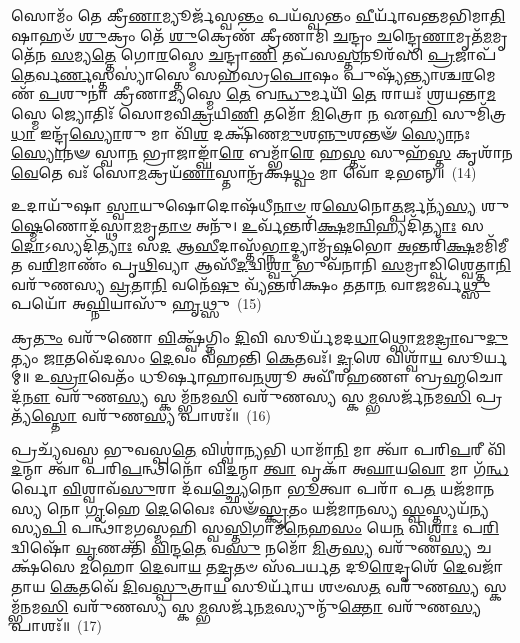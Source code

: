 {\anuvakamend[{𑌅𑌨𑍁᳴ \ul{𑌸}\-𑌪𑍍𑌤 𑌚᳴}]}%

𑌸𑍋𑌮𑌂᳴ 𑌤𑍇 𑌕𑍍𑌰𑍀\-\ul{𑌣𑌾}\-𑌮𑍍𑌯𑍂𑌰𑍍𑌜᳴𑌸𑍍𑌵\-\ul{𑌨𑍍𑌤𑌂} 𑌪𑌯᳴𑌸𑍍𑌵𑌨𑍍𑌤𑌂 \ul{𑌵𑍀}\-𑌰𑍍𑌯𑌾᳴𑌵𑌨𑍍𑌤𑌮𑌭𑌿𑌮𑌾\-\ul{𑌤𑌿}\-\-𑌷𑌾𑌹𑍞᳴ \ul{𑌶𑍁}\-𑌕𑍍𑌰𑌂 𑌤𑍇᳴ \ul{𑌶𑍁}\-𑌕𑍍𑌰𑍇𑌣᳴ 𑌕𑍍𑌰𑍀𑌣𑌾𑌮𑌿 \ul{𑌚}\-𑌨𑍍𑌦𑍍𑌰𑌂 \ul{𑌚}\-𑌨𑍍𑌦𑍍𑌰𑍇\-\ul{𑌣𑌾}\-𑌮𑍃𑌤᳴\-\ul{𑌮}\-𑌮𑍃𑌤𑍇᳴𑌨 \ul{𑌸}\-𑌮𑍍𑌯\-\ul{𑌤𑍍𑌤𑍇} 𑌗𑍋\-\ul{𑌰}\-𑌸𑍍𑌮𑍇 \ul{𑌚}\-𑌨𑍍𑌦𑍍𑌰𑌾\-\ul{𑌣𑌿} 𑌤𑌪᳴𑌸\-\ul{𑌸𑍍𑌤}\-𑌨𑍂𑌰᳴𑌸𑌿 \ul{𑌪𑍍𑌰}\-𑌜𑌾𑌪᳴\-\ul{𑌤𑍇}\-𑌰𑍍𑌵\-\ul{𑌰𑍍𑌣}\-𑌸𑍍𑌤𑌸𑍍𑌯𑌾॑𑌸𑍍𑌤𑍇 𑌸𑌹𑌸𑍍𑌰\-\ul{𑌪𑍋}\-𑌷𑌂 𑌪𑍁𑌷𑍍𑌯᳴𑌨𑍍𑌤𑍍𑌯𑌾𑌶𑍍𑌚\-\ul{𑌰}\-𑌮𑍇𑌣᳴ \ul{𑌪}\-𑌶𑍁𑌨𑌾॑ 𑌕𑍍𑌰𑍀𑌣𑌾\-\ul{𑌮𑍍𑌯}\-𑌸𑍍𑌮𑍇 \ul{𑌤𑍇} 𑌬\-\ul{𑌨𑍍𑌧𑍁}\-𑌰𑍍𑌮𑌯𑌿᳴ \ul{𑌤𑍇} 𑌰𑌾𑌯𑌃᳴ 𑌶𑍍𑌰𑌯𑌨𑍍𑌤𑌾\-\ul{𑌮}\-𑌸𑍍𑌮𑍇 𑌜𑍍𑌯𑍋𑌤𑌿𑌃᳴ 𑌸𑍋𑌮𑌵𑌿\-\ul{𑌕𑍍𑌰}\-𑌯𑌿\-\ul{𑌣𑌿} 𑌤𑌮𑍋᳴ \ul{𑌮𑌿}\-𑌤𑍍𑌰𑍋 \ul{𑌨} 𑌏\-\ul{𑌹𑌿} 𑌸𑍁𑌮𑌿᳴𑌤𑍍𑌰\-\ul{𑌧𑌾} 𑌇𑌨𑍍𑌦𑍍𑌰᳴\-\ul{𑌸𑍍𑌯𑍋}\-𑌰𑍁 𑌮𑌾 𑌵𑌿᳴\-\ul{𑌶} 𑌦𑌕𑍍𑌷𑌿᳴𑌣\-\ul{𑌮𑍁}\-𑌶\-\ul{𑌨𑍍𑌨𑍁}\-𑌶𑌨𑍍𑌤𑍟᳴ \ul{𑌸𑍍𑌯𑍋}\-𑌨𑌃 \ul{𑌸𑍍𑌯𑍋}\-𑌨𑍟 𑌸𑍍𑌵𑌾\-\ul{𑌨} 𑌭𑍍𑌰𑌾𑌜𑌾𑌙𑍍𑌘𑌾᳴\-\ul{𑌰𑍇} 𑌬𑌮𑍍𑌭𑌾᳴\-\ul{𑌰𑍇} 𑌹\-\ul{𑌸𑍍𑌤} 𑌸𑍁𑌹᳴\-\ul{𑌸𑍍𑌤} 𑌕𑍃𑌶𑌾᳴𑌨\-\ul{𑌵𑍇}\-𑌤𑍇 𑌵𑌃᳴ 𑌸𑍋\-\ul{𑌮}\-𑌕𑍍𑌰𑌯᳴\-\ul{𑌣𑌾}\-𑌸𑍍𑌤𑌾𑌨𑍍𑌰᳴𑌕𑍍𑌷\-\ul{𑌧𑍍𑌵𑌂} 𑌮𑌾 𑌵𑍋᳴ 𑌦𑌭𑌨𑍍𑌨𑍍॥~(14)

{\anuvakamend[{\-\ul{𑌊}\-𑌰𑍁𑌂 𑌦𑍍𑌵𑌾𑌵𑌿𑍞᳴𑌶𑌤𑌿𑌶𑍍𑌵}]}%

𑌉𑌦𑌾𑌯𑍁᳴𑌷𑌾 \ul{𑌸𑍍𑌵𑌾}\-𑌯𑍁𑌷𑍋𑌦𑍋𑌷᳴𑌧𑍀\-\ul{𑌨𑌾}\-\-\ul{𑍞} 𑌰\-\ul{𑌸𑍇}\-𑌨𑍋\-\ul{𑌤𑍍𑌪}\-𑌰𑍍𑌜𑌨𑍍𑌯᳴\-\ul{𑌸𑍍𑌯} 𑌶𑍁\-\ul{𑌷𑍍𑌮𑍇}\-𑌣𑍋𑌦᳴𑌸𑍍𑌥𑌾\-\-\ul{𑌮}\-𑌮𑍃\-\ul{𑌤𑌾}\-\-\ul{𑍞} 𑌅𑌨𑍁᳴। \ul{𑌉}\-𑌰𑍍𑌵᳴𑌨𑍍𑌤𑌰𑌿᳴\-\ul{𑌕𑍍𑌷}\-𑌮\-\ul{𑌨𑍍𑌵𑌿}\-𑌹𑍍𑌯𑌦𑌿᳴\-\ul{𑌤𑍍𑌯𑌾𑌃} 𑌸\-\ul{𑌦𑍋}\-\-𑌽𑌸𑍍𑌯𑌦𑌿᳴\-\ul{𑌤𑍍𑌯𑌾𑌃} 𑌸\-\ul{𑌦} 𑌆\-\ul{𑌸𑍀}\-\-𑌦𑌾𑌸𑍍𑌤᳴\-\ul{𑌭𑍍𑌨𑌾}\-𑌦𑍍𑌦𑍍𑌯𑌾𑌮𑍃᳴\-\ul{𑌷}\-𑌭𑍋 \ul{𑌅}\-𑌨𑍍𑌤𑌰𑌿᳴\-\ul{𑌕𑍍𑌷}\-𑌮𑌮𑌿᳴𑌮𑍀𑌤 𑌵\-\ul{𑌰𑌿}\-𑌮𑌾𑌣𑌂᳴ 𑌪𑍃\-\ul{𑌥𑌿}\-𑌵𑍍𑌯𑌾 𑌆𑌸𑍀᳴\-\ul{𑌦}\-𑌦𑍍𑌵𑌿\-\ul{𑌶𑍍𑌵𑌾} 𑌭𑍁𑌵᳴𑌨𑌾𑌨𑌿 \ul{𑌸}\-𑌮𑍍𑌰𑌾𑌡𑍍𑌵𑌿𑌶𑍍𑌵𑍇𑌤𑍍𑌤𑌾\-\ul{𑌨𑌿} 𑌵𑌰𑍁᳴𑌣𑌸𑍍𑌯 \ul{𑌵𑍍𑌰}\-𑌤𑌾\-\ul{𑌨𑌿} 𑌵𑌨𑍇᳴\-\ul{𑌷𑍁} 𑌵𑍍𑌯᳴𑌨𑍍𑌤𑌰𑌿᳴𑌕𑍍𑌷𑌂 𑌤𑌤𑌾\-\ul{𑌨} 𑌵𑌾\-\ul{𑌜}\-𑌮𑌰𑍍𑌵᳴\-\ul{𑌥𑍍𑌸𑍁} 𑌪𑌯𑍋᳴ 𑌅\-\ul{𑌘𑍍𑌨𑌿}\-𑌯𑌾𑌸𑍁᳴ \ul{𑌹𑍃}\-𑌥𑍍𑌸𑍁~(15)

𑌕𑍍𑌰\-\ul{𑌤𑍁𑌂} 𑌵𑌰𑍁᳴𑌣𑍋 \ul{𑌵𑌿}\-𑌕𑍍𑌷𑍍𑌵᳴𑌗𑍍𑌨𑌿𑌂 \ul{𑌦𑌿}\-𑌵𑌿 𑌸𑍂𑌰𑍍𑌯᳴𑌮𑌦\-\ul{𑌧𑌾}\-𑌥𑍍𑌸𑍋\-\ul{𑌮}\-𑌮\-\ul{𑌦𑍍𑌰𑌾}\-𑌵𑍁\-\ul{𑌦𑍁}\-𑌤𑍍𑌯𑌂 \ul{𑌜𑌾}\-𑌤𑌵𑍇᳴𑌦𑌸𑌂 \ul{𑌦𑍇}\-𑌵𑌂 𑌵᳴𑌹𑌨𑍍𑌤𑌿 \ul{𑌕𑍇}\-𑌤𑌵𑌃᳴। \ul{𑌦𑍃}\-𑌶𑍇 𑌵𑌿𑌶𑍍𑌵𑌾᳴\-\ul{𑌯} 𑌸𑍂𑌰𑍍𑌯𑌮𑍍॑॥ 𑌉\-\ul{𑌸𑍍𑌰𑌾}\-𑌵𑍇𑌤𑌂᳴ 𑌧𑍂𑌰𑍍\mbox{}𑌷𑌾𑌹𑌾𑌵\-\ul{𑌨}\-𑌶𑍍𑌰𑍂 𑌅𑌵𑍀᳴𑌰𑌹𑌣𑍗 𑌬𑍍𑌰\-\ul{𑌹𑍍𑌮}\-𑌚𑍋𑌦᳴\-\ul{𑌨𑍗} 𑌵𑌰𑍁᳴𑌣\-\ul{𑌸𑍍𑌯} 𑌸𑍍𑌕𑌮𑍍𑌭᳴𑌨𑌮\-\ul{𑌸𑌿} 𑌵𑌰𑍁᳴𑌣𑌸𑍍𑌯 𑌸𑍍𑌕\-\ul{𑌮𑍍𑌭}\-𑌸𑌰𑍍𑌜᳴𑌨𑌮\-\ul{𑌸𑌿} 𑌪𑍍𑌰𑌤𑍍𑌯᳴\-\ul{𑌸𑍍𑌤𑍋} 𑌵𑌰𑍁᳴𑌣\-\ul{𑌸𑍍𑌯} 𑌪𑌾𑌶𑌃᳴॥~(16)

{\anuvakamend[{\-\ul{𑌹𑍃}\-𑌥𑍍𑌸𑍁 𑌪𑌞𑍍𑌚᳴𑌤𑍍𑌰𑌿𑍞𑌶𑌚𑍍𑌚}]}%

𑌪𑍍𑌰𑌚𑍍𑌯᳴𑌵𑌸𑍍𑌵 𑌭𑍁𑌵𑌸𑍍𑌪\-\ul{𑌤𑍇} 𑌵𑌿𑌶𑍍𑌵𑌾॑\-\ul{𑌨𑍍𑌯}\-𑌭𑌿 𑌧𑌾𑌮𑌾᳴\-\ul{𑌨𑌿} 𑌮𑌾 𑌤𑍍𑌵𑌾᳴ 𑌪𑌰𑌿\-\ul{𑌪}\-𑌰𑍀 𑌵𑌿᳴\-\ul{𑌦}\-𑌨𑍍𑌮𑌾 𑌤𑍍𑌵𑌾᳴ 𑌪𑌰𑌿\-\ul{𑌪}\-𑌨𑍍𑌥𑌿𑌨𑍋᳴ 𑌵𑌿\-\ul{𑌦}\-𑌨𑍍𑌮𑌾 \ul{𑌤𑍍𑌵𑌾} 𑌵𑍃𑌕𑌾᳴ 𑌅\-\ul{𑌘𑌾}\-𑌯\-\ul{𑌵𑍋} 𑌮𑌾 𑌗᳴\-\ul{𑌨𑍍𑌧}\-𑌰𑍍𑌵𑍋 \ul{𑌵𑌿}\-𑌶𑍍𑌵𑌾𑌵᳴\-\ul{𑌸𑍁}\-𑌰𑌾 𑌦᳴𑌘\-\ul{𑌚𑍍𑌛𑍍𑌯𑍇}\-𑌨𑍋 \ul{𑌭𑍂}\-𑌤𑍍𑌵𑌾 𑌪𑌰𑌾᳴ 𑌪\-\ul{𑌤} 𑌯𑌜᳴𑌮𑌾𑌨𑌸𑍍𑌯 𑌨𑍋 \ul{𑌗𑍃}\-𑌹𑍇 \ul{𑌦𑍇}\-𑌵𑍈𑌃 𑌸𑍟᳴\-\ul{𑌸𑍍𑌕𑍃}\-𑌤𑌂 𑌯𑌜᳴𑌮𑌾𑌨𑌸𑍍𑌯 \ul{𑌸𑍍𑌵}\-𑌸𑍍𑌤𑍍𑌯𑌯᳴\-\ul{𑌨𑍍𑌯}\-𑌸𑍍𑌯\-\ul{𑌪𑌿} 𑌪𑌨𑍍𑌥𑌾᳴𑌮𑌗𑌸𑍍𑌮𑌹𑌿 𑌸𑍍𑌵\-\ul{𑌸𑍍𑌤𑌿}\-𑌗𑌾𑌮᳴\-\ul{𑌨𑍇}\-𑌹\-\ul{𑌸𑌂} 𑌯𑍇\-\ul{𑌨} 𑌵𑌿\-\ul{𑌶𑍍𑌵𑌾𑌃} 𑌪\-\ul{𑌰𑌿} 𑌦𑍍𑌵𑌿𑌷𑍋᳴ \ul{𑌵𑍃}\-𑌣𑌕𑍍𑌤𑌿᳴ \ul{𑌵𑌿}\-𑌨𑍍𑌦\-\ul{𑌤𑍇} 𑌵\-\ul{𑌸𑍁} 𑌨𑌮𑍋᳴ \ul{𑌮𑌿}\-𑌤𑍍𑌰\-\ul{𑌸𑍍𑌯} 𑌵𑌰𑍁᳴𑌣\-\ul{𑌸𑍍𑌯} 𑌚𑌕𑍍𑌷᳴𑌸𑍇 \ul{𑌮}\-𑌹𑍋 \ul{𑌦𑍇}\-𑌵𑌾\-\ul{𑌯} 𑌤\-\ul{𑌦𑍃}\-𑌤𑍞 𑌸᳴𑌪𑌰𑍍𑌯𑌤 𑌦𑍂\-\ul{𑌰𑍇}\-𑌦𑍃𑌶𑍇᳴ \ul{𑌦𑍇}\-𑌵𑌜𑌾᳴𑌤𑌾𑌯 \ul{𑌕𑍇}\-𑌤𑌵𑍇᳴ \ul{𑌦𑌿}\-𑌵\-\ul{𑌸𑍍𑌪𑍁}\-𑌤𑍍𑌰𑌾\-\ul{𑌯} 𑌸𑍂𑌰𑍍𑌯𑌾᳴𑌯 𑌶𑍞𑌸\-\ul{𑌤} 𑌵𑌰𑍁᳴𑌣\-\ul{𑌸𑍍𑌯} 𑌸𑍍𑌕𑌮𑍍𑌭᳴𑌨𑌮\-\ul{𑌸𑌿} 𑌵𑌰𑍁᳴𑌣𑌸𑍍𑌯 𑌸𑍍𑌕\-\ul{𑌮𑍍𑌭}\-𑌸𑌰𑍍𑌜᳴𑌨\-\ul{𑌮}\-𑌸𑍍𑌯𑍁𑌨𑍍𑌮𑍁᳴\-\ul{𑌕𑍍𑌤𑍋} 𑌵𑌰𑍁᳴𑌣\-\ul{𑌸𑍍𑌯} 𑌪𑌾𑌶𑌃᳴॥~(17)

